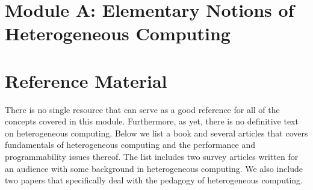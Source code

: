 \documentclass[11pt]{article}
\begin{document}
\section*{Module A: Elementary Notions of Heterogeneous Computing}
\section*{Reference Material}

There is no single resource that can serve as a good reference for all of the concepts covered in
this module. Furthermore, as yet, there is no definitive text on heterogeneous computing. Below we
list a book and several articles that covers fundamentals of heterogeneous computing and the
performance and programmability issues thereof. The list includes two survey articles written for an
audience with some background in heterogeneous computing. We also include two papers that
specifically deal with the pedagogy of heterogeneous computing.  

\nocite{Hwu:Book15}
\nocite{Zahran:CACM17}
\nocite{Mittal:CSUR15}
\nocite{Mittal:CSUR16}
\nocite{Gopalakrishnan:IPDPSW12}
\nocite{Gutierrez:EDUHPC18}



\end{document}
